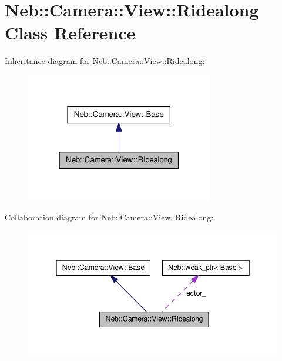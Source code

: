 \hypertarget{classNeb_1_1Camera_1_1View_1_1Ridealong}{\section{\-Neb\-:\-:\-Camera\-:\-:\-View\-:\-:\-Ridealong \-Class \-Reference}
\label{classNeb_1_1Camera_1_1View_1_1Ridealong}
}


\-Inheritance diagram for \-Neb\-:\-:\-Camera\-:\-:\-View\-:\-:\-Ridealong\-:
\nopagebreak
\begin{figure}[H]
\begin{center}
\leavevmode
\includegraphics[width=232pt]{classNeb_1_1Camera_1_1View_1_1Ridealong__inherit__graph}
\end{center}
\end{figure}


\-Collaboration diagram for \-Neb\-:\-:\-Camera\-:\-:\-View\-:\-:\-Ridealong\-:
\nopagebreak
\begin{figure}[H]
\begin{center}
\leavevmode
\includegraphics[width=348pt]{classNeb_1_1Camera_1_1View_1_1Ridealong__coll__graph}
\end{center}
\end{figure}
